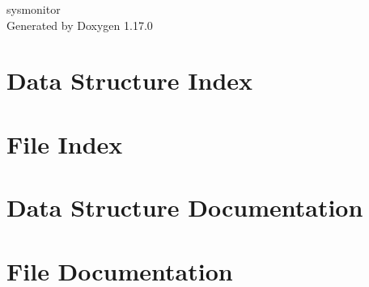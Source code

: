 \documentclass[twoside]{book}
\newcommand{\+}{\discretionary{\mbox{\scriptsize$\hookleftarrow$}}{}{}}
\newcommand{\clearemptydoublepage}{%
    \newpage{\pagestyle{empty}\cleardoublepage}%
  }
\begin{document}
  \raggedbottom
    \hypersetup{pageanchor=false,
                bookmarksnumbered=true,
                pdfencoding=unicode
               }
  \begin{titlepage}
  \vspace*{7cm}
  \begin{center}%
  {\Large sysmonitor}\\
  \vspace*{1cm}
  {\large Generated by Doxygen 1.17.0}\\
  \end{center}
  \end{titlepage}
  \clearemptydoublepage
  \tableofcontents
  \clearemptydoublepage
  \hypersetup{pageanchor=true}
\chapter{Data Structure Index}

\chapter{File Index}

\chapter{Data Structure Documentation}












\chapter{File Documentation}




  \backmatter
  \newpage
  \clearemptydoublepage
  \printindex
\end{document}
